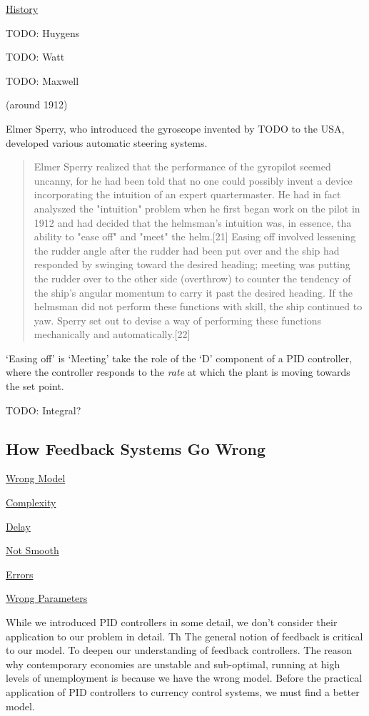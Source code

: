 \underline{History}

TODO: Huygens

TODO: Watt

TODO: Maxwell

(around 1912)

Elmer Sperry, who introduced the gyroscope invented by TODO to the USA, developed various automatic
steering systems.

\begin{quote}
Elmer Sperry realized that the performance of the gyropilot seemed uncanny, for he had been told
that no one could possibly invent a device incorporating the intuition of an expert quartermaster.
He had in fact analyszed the "intuition" problem when he first began work on the pilot in 1912 and
had decided that the helmsman's intuition was, in essence, tha ability to "ease off" and "meet" the
helm.[21] Easing off involved lessening the rudder angle after the rudder had been put over and the
ship had responded by swinging toward the desired heading; meeting was putting the rudder over to
the other side (overthrow) to counter the tendency of the ship's angular momentum to carry it past
the desired heading. If the helmsman did not perform these functions with skill, the ship continued
to yaw. Sperry set out to devise a way of performing these functions mechanically and automatically.[22]
\end{quote}

`Easing off' is `Meeting' take the role of the `D' component of a PID controller, where the
controller responds to the \textit{rate} at which the plant is moving towards the set point.

TODO: Integral?


\subsection{How Feedback Systems Go Wrong}

\underline{Wrong Model}

\underline{Complexity}

\underline{Delay}

\underline{Not Smooth}

\underline{Errors}


\underline{Wrong Parameters}

While we introduced PID controllers in some detail, we don't consider their application to our
problem in detail. Th The general notion of feedback is critical to our model. To deepen our
understanding of feedback controllers. The reason why contemporary economies are unstable and
sub-optimal, running at high levels of unemployment is because we have the wrong model. Before the
practical application of PID controllers to currency control systems, we must find a better model. 

